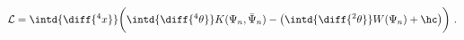 \begin{equation}
  \label{eq:nonlocalkahler}
    \mathcal{L} = \intd{\diff{^4x}} \biggl( \intd{\diff{^4 \theta}} K(\Psi_n,
  \bar{\Psi}_n) - \bigl(\intd{\diff{^2 \theta}} W(\Psi_n) + \hc \bigr) \biggr)\ .
\end{equation}

